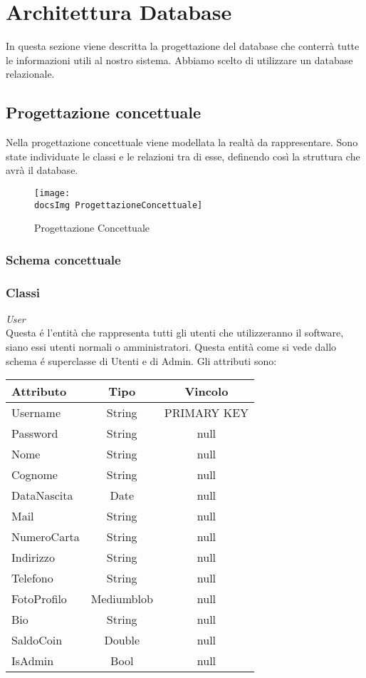 \section{Architettura Database}{
	In questa sezione viene descritta la progettazione del database che conterrà tutte le informazioni utili al nostro sistema. Abbiamo scelto di utilizzare un database relazionale.
	
	\subsection{Progettazione concettuale}{
		Nella progettazione concettuale viene modellata la realtà da rappresentare. Sono state individuate le classi e le relazioni tra di esse, definendo così la struttura che avrà il database.
		
		\begin{figure}[ht]
				\texttt{[image: \\docsImg ProgettazioneConcettuale]}
				\caption{Progettazione Concettuale}
				\label{Fig. Progettazione Concettuale}
		\end{figure}
			
			\subsubsection{Schema concettuale}
			
			\subsubsection{Classi}
			\textit{User}\\
			Questa é l'entità che rappresenta tutti gli utenti che utilizzeranno il software, siano essi utenti normali o amministratori. Questa entità come si vede dallo schema é superclasse di Utenti e di Admin. Gli attributi sono: 
			\begin{center}
			\begin{tabular}{lcc}
				\textbf{Attributo}&\textbf{Tipo}&\textbf {Vincolo}\\
				\hline
				Username&String&PRIMARY KEY\\
				Password&String&null\\
				Nome&String&null \\
				Cognome&String&null \\
				DataNascita&Date&null\\
				Mail&String&null \\
				NumeroCarta&String&null \\
				Indirizzo&String&null \\
				Telefono&String&null \\
				FotoProfilo&Mediumblob&null\\
				Bio&String&null \\
				SaldoCoin&Double&null \\
				IsAdmin&Bool&null\\
			\end{tabular}
			\end{center}
		
}}
